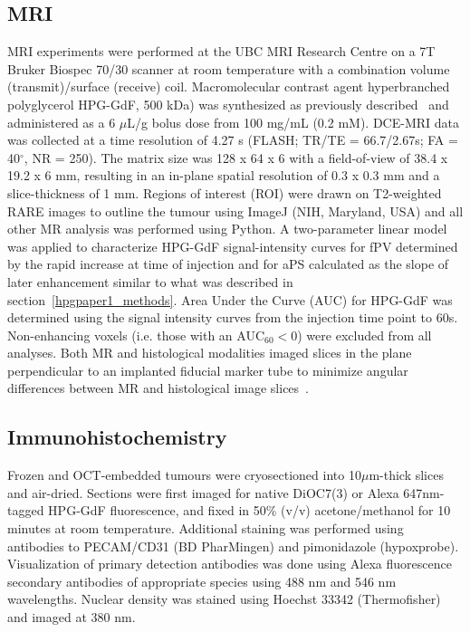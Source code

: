 \subsection{MRI}
MRI experiments were performed at the UBC MRI Research Centre on a 7T Bruker Biospec 70/30 scanner at room temperature with a combination volume (transmit)/surface (receive) coil.
Macromolecular contrast agent hyperbranched polyglycerol \acs{HPG-GdF}, 500 kDa) was synthesized as previously described~\cite{Saatchi:2012hc,Saatchi:2012gc} and administered as a 6 $\mu$L/g bolus dose from 100 mg/mL (0.2 mM).
\acs{DCE-MRI} data was collected at a time resolution of 4.27 s (FLASH; TR/TE = 66.7/2.67s; FA = 40$^\circ$, NR = 250).
The matrix size was 128 x 64 x 6 with a field-of-view of 38.4 x 19.2 x 6 mm, resulting in an in-plane spatial resolution of 0.3 x 0.3 mm and a slice-thickness of 1 mm.
Regions of interest (\acs{ROI}) were drawn on T2-weighted RARE images to outline the tumour using ImageJ (NIH, Maryland, USA) and all other MR analysis was performed using Python.
A two-parameter linear model was applied to characterize \acs{HPG-GdF} signal-intensity curves for \acs{fPV} determined by the rapid increase at time of injection and for \acs{aPS} calculated as the slope of later enhancement similar to what was described in section~\ref{hpgpaper1_methods}.
Area Under the Curve (\acs{AUC}) for \acs{HPG-GdF} was determined using the signal intensity curves from the injection time point to 60s.
Non-enhancing voxels (i.e. those with an AUC$_{60} < 0$) were excluded from all analyses.
Both MR and histological modalities imaged slices in the plane perpendicular to an implanted fiducial marker tube to minimize angular differences between MR and histological image slices~\cite{Bains:2009hh}.

\subsection{Immunohistochemistry}
Frozen and OCT-embedded tumours were cryosectioned into 10$\mu$m-thick slices and air-dried.
Sections were first imaged for native DiOC7(3) or Alexa 647nm-tagged \acs{HPG-GdF} fluorescence, and fixed in 50\% (v/v) acetone/methanol for 10 minutes at room temperature.
Additional staining was performed using antibodies to PECAM/CD31 (BD PharMingen) and pimonidazole (hypoxprobe).
Visualization of primary detection antibodies was done using Alexa fluorescence secondary antibodies of appropriate species using 488 nm and 546 nm wavelengths.
Nuclear density was stained using Hoechst 33342 (Thermofisher) and imaged at 380 nm.

